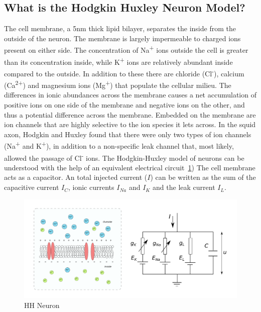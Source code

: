 \documentclass[10pt,letterpaper]{article}
\begin{document}
\subsection*{What is the Hodgkin Huxley Neuron Model?}
The cell membrane, a 5nm thick lipid bilayer, separates the inside from the outside of the neuron. The membrane is largely impermeable to charged ions present on either side. The concentration of Na\textsuperscript{+} ions outside the cell is greater than its concentration inside, while K\textsuperscript{+} ions are relatively abundant inside compared to the outside. In addition to these there are chloride (Cl\textsuperscript{-}), calcium (Ca\textsuperscript{2+}) and magnesium ions (Mg\textsuperscript{+}) that populate the cellular milieu. The differences in ionic abundances across the membrane causes a net accumulation of positive ions on one side of the membrane and negative ions on the other, and thus a potential difference across the membrane. Embedded on the membrane are ion channels that are highly selective to the ion species it lets across. In the squid axon, Hodgkin and Huxley found that there were only two types of ion channels (Na\textsuperscript{+} and K\textsuperscript{+}), in addition to a non-specific leak channel that, most likely, allowed the passage of Cl\textsuperscript{-} ions. The Hodgkin-Huxley model of neurons can be understood with the help of an equivalent electrical circuit~\ref{fig:HH}) The cell membrane acts as a capacitor. An total injected current ($I$) can be written as the sum of the capacitive current $I_{C}$, ionic currents $I_{Na}$ and $I_{K}$ and the leak current $I_L$.

\begin{figure}[H]
\begin{center}
\includegraphics[scale=0.4]{Figures/fig7.pdf} 
\caption{HH Neuron}
\label{fig:HH}
\end{center}
\end{figure}
\end{document}
